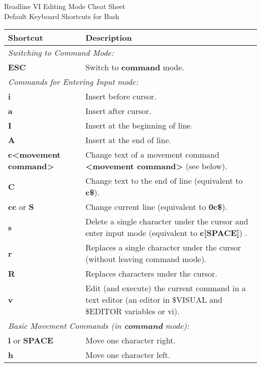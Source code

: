 \documentclass{article}
\begin{document}
\begin{center}
\Large Readline VI Editing Mode Cheat Sheet \\
\Large Default Keyboard Shortcuts for Bash
\end{center}

\vspace{0.4in}

\renewcommand{\arraystretch}{1.2}
\begin{tabular}{|p{4.5cm}|p{13cm}|}
\hline
\large\textbf{Shortcut} & \large\textbf{Description} \\
\hline
\multicolumn{2}{|l|}{\small\it{Switching to Command Mode:}} \\
\hline
\textbf{ESC} & Switch to \textbf{command} mode. \\
\hline
\multicolumn{2}{|l|}{\small\it{Commands for Entering Input mode:}} \\
\hline
\textbf{i} & Insert before cursor. \\
\hline
\textbf{a} & Insert after cursor. \\
\hline
\textbf{I} & Insert at the beginning of line. \\
\hline
\textbf{A} & Insert at the end of line. \\
\hline
\textbf{c{\textless}movement command{\textgreater}} & Change text of a movement command \textbf{{\textless}movement command{\textgreater}} (see below). \\
\hline
\textbf{C} & Change text to the end of line (equivalent to \textbf{c\$}). \\
\hline
\textbf{cc} or \textbf{S} & Change current line (equivalent to \textbf{0c\$}). \\
\hline
\textbf{s} & Delete a single character under the cursor and enter input mode (equivalent to \textbf{c[SPACE]}) . \\
\hline
\textbf{r} & Replaces a single character under the cursor (without leaving command mode). \\
\hline
\textbf{R} & Replaces characters under the cursor. \\
\hline
\textbf{v} & Edit (and execute) the current command in a text editor (an editor in \$VISUAL and \$EDITOR variables or vi). \\
\hline
\multicolumn{2}{|l|}{\small\it{Basic Movement Commands (in \textbf{command} mode):}} \\
\hline
\textbf{l} or \textbf{SPACE} & Move one character right. \\
\hline
\textbf{h} & Move one character left. \\

\end{tabular}
\end{document}
